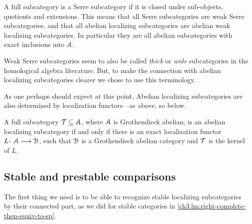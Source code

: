 \begin{remark}
    A full subcategory is a Serre subcategory if it is closed under sub-objects, quotients and extensions. This means that all Serre subcategories are weak Serre subcategories, and that all abelian localizing subcategories are abelian weak localizing subcategories. In particular they are all abelian subcategories with exact inclusions into $\EuScript{A}$. 
\end{remark}

\begin{remark}
    Weak Serre subcategories seem to also be called \emph{thick} or \emph{wide} subcategories in the homological algebra literature. But, to make the connection with abelian localizing subcategories clearer we chose to use this terminology. 
\end{remark}

As one perhaps should expect at this point, Abelian localizing subcategories are also determined by localization functors---as above, so below. 

\begin{proposition}
    \label{ch3:prop:abelian-localizing-iff-kernel-of-localization}
    A full subcategory $\mathcal{T}\subseteq \EuScript{A}$, where $\EuScript{A}$ is Grothendieck abelian, is an abelian localizing subcategory if and only if there is an exact localization functor $L\colon\EuScript{A}\longrightarrow \EuScript{B}$, such that $\EuScript{B}$ is a Grothendieck abelian category and $\mathcal{T}$ is the kernel of $L$. 
\end{proposition}







\subsection{Stable and prestable comparisons}

The first thing we need is to be able to recognize stable localizing subcategories by their connected part, as we did for stable categories in \cref{ch3:lm:right-complete-then-equiv-to-sp}. 

